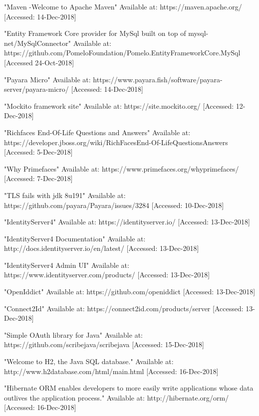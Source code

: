  "Maven -Welcome to Apache Maven"
Available at: https://maven.apache.org/ [Accessed: 14-Dec-2018]

 "Entity Framework Core provider for MySql built on top of mysql-net/MySqlConnector"
Available at: https://github.com/PomeloFoundation/Pomelo.EntityFrameworkCore.MySql
[Accessed 24-Oct-2018]

 "Payara Micro"
Available at: https://www.payara.fish/software/payara-server/payara-micro/ [Accessed: 14-Dec-2018]

 "Mockito framework site"
Available at: https://site.mockito.org/ [Accessed: 12-Dec-2018]

 "Richfaces End-Of-Life Questions and Answers"
Available at: https://developer.jboss.org/wiki/RichFacesEnd-Of-LifeQuestionsAnswers [Accessed: 5-Dec-2018]

 "Why Primefaces"
Available at: https://www.primefaces.org/whyprimefaces/ [Accessed: 7-Dec-2018]

 "TLS fails with jdk 8u191" Available at: https://github.com/payara/Payara/issues/3284 [Accessed: 10-Dec-2018]

 "IdentityServer4" Available at: https://identityserver.io/ [Accessed: 13-Dec-2018]

 "IdentityServer4 Documentation" Available at: http://docs.identityserver.io/en/latest/ [Accessed: 13-Dec-2018]

 "IdentityServer4 Admin UI" Available at: https://www.identityserver.com/products/ [Accessed: 13-Dec-2018]

 "OpenIddict" Available at: https://github.com/openiddict [Accessed: 13-Dec-2018]

 "Connect2Id" Available at: https://connect2id.com/products/server [Accessed: 13-Dec-2018]

 "Simple OAuth library for Java" Available at: https://github.com/scribejava/scribejava [Accessed: 15-Dec-2018]

 "Welcome to H2, the Java SQL database." Available at: http://www.h2database.com/html/main.html [Accessed: 16-Dec-2018]

 "Hibernate ORM enables developers to more easily write applications whose data outlives the application process." Available at: http://hibernate.org/orm/ [Accessed: 16-Dec-2018]

